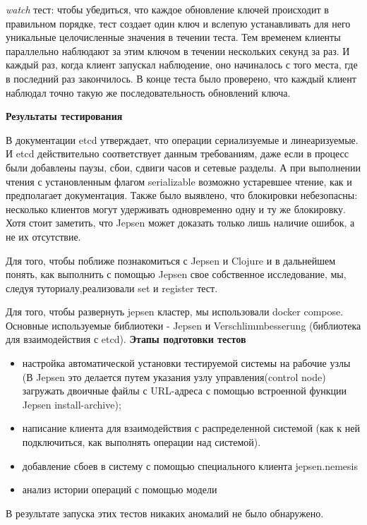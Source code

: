 \documentclass[12pt,  openany]{book}
\begin{document}
\textit{watch} тест: чтобы убедиться, что каждое обновление ключей происходит в правильном порядке, тест создает один ключ и вслепую устанавливать для него уникальные целочисленные значения в течении теста. Тем временем клиенты параллельно наблюдают за этим ключом в течении нескольких секунд за раз. И каждый раз, когда клиент запускал наблюдение, оно начиналось с того места, где в последний раз закончилось. В конце теста было проверено, что каждый клиент наблюдал точно такую же последовательность обновлений ключа. 
\par
\textbf{Результаты тестирования}
\par
В документации etcd утверждает, что операции сериализуемые и линеаризуемые. 
И etcd действительно соответствует данным требованиям, даже если в процесс были добавлены паузы, сбои, сдвиги часов и сетевые разделы. А при выполнении чтения с установленным флагом serializable возможно устаревшее чтение, как и предполагает документация.
Также было выявлено, что блокировки небезопасны: несколько клиентов могут удерживать одновременно одну и ту же блокировку.
Хотя стоит заметить, что Jepsen может доказать только лишь наличие ошибок, а не их отсутствие.
\par
Для того, чтобы поближе познакомиться с Jepsen и Clojure и в дальнейшем понять, как выполнить с помощью Jepsen свое собственное исследование, мы, следуя туториалу,реализовали set и register тест.  \par
Для того, чтобы развернуть jepsen  кластер, мы использовали docker compose. 
Основные используемые библиотеки - Jepsen и Verschlimmbesserung (библиотека для взаимодействия с etcd). 
\textbf{Этапы подготовки тестов}
\begin{itemize}
\item настройка автоматической установки тестируемой системы на рабочие узлы (В Jepsen это делается путем указания узлу управления(control node) загружать двоичные файлы с URL-адреса с помощью встроенной функции Jepsen install-archive);
\item написание клиента для взаимодействия с распределенной системой (как к ней подключиться, как выполнять операции над системой). 
\item добавление сбоев в систему с помощью специального клиента jepsen.nemesis
\item анализ истории операций с помощью модели
\end{itemize}
\par
В результате запуска этих тестов никаких аномалий не было обнаружено.
\end{document}
